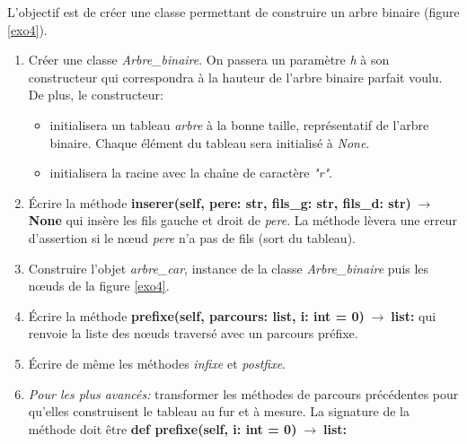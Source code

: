 \documentclass[a4paper,11pt]{article}
\begin{document}
\begin{Form}
\begin{exo}
\begin{center}
            \label{exo4}
        \end{center}
        L'objectif est de créer une classe permettant de construire un arbre binaire (figure \ref{exo4}).
        \begin{enumerate}
            \item Créer une classe \emph{Arbre\_binaire}. On passera un paramètre \emph{h} à son constructeur qui correspondra à la hauteur de l'arbre binaire parfait voulu. De plus, le constructeur:
                  \begin{itemize}
                      \item initialisera un tableau \emph{arbre} à la bonne taille, représentatif de l'arbre binaire. Chaque élément du tableau sera initialisé à \emph{None}.
                      \item initialisera la racine avec la chaîne de caractère \emph{"r"}.
                  \end{itemize}
            \item Écrire la méthode \textbf{inserer(self, pere: str, fils\_g: str, fils\_d: str)$\;\rightarrow\;$None} qui insère les fils gauche et droit de \emph{pere}. La méthode lèvera une erreur d'assertion si le nœud \emph{pere} n'a pas de fils (sort du tableau).
            \item Construire l'objet \emph{arbre\_car}, instance de la classe \emph{Arbre\_binaire} puis les nœuds de la figure \ref{exo4}.
            \item Écrire la méthode \textbf{prefixe(self, parcours: list, i: int = 0)$\;\rightarrow\;$list:} qui renvoie la liste des nœuds traversé avec un parcours préfixe.
            \item Écrire de même les méthodes \emph{infixe} et \emph{postfixe}.
            \item \emph{Pour les plus avancés:} transformer les méthodes de parcours précédentes pour qu'elles construisent le tableau au fur et à mesure. La signature de la méthode doit être \textbf{def prefixe(self, i: int = 0)$\;\rightarrow\;$list:}
        \end{enumerate}
    \end{exo}
\end{Form}
\end{document}

